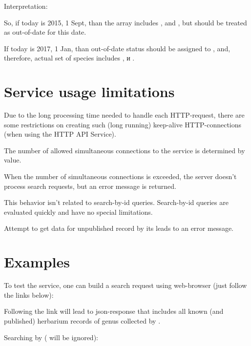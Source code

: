 \documentclass[letterpaper,10pt,english]{sphinxmanual}
\begin{document}
Interpretation:

So, if today is 2015, 1 Sept, than the array includes
,  and , but  should be treated
as out-of-date for this date.

If today is 2017,  1 Jan, than out-of-date status should be assigned to ,
and, therefore, actual set of species includes
,  и .


\section{Service usage limitations}
\label{\detokenize{http_api:service-usage-limitations}}
Due to the long processing time needed to handle each HTTP-request,
there are some restrictions on creating
such (long running) keep-alive HTTP-connections (when using the HTTP API Service).

The number of allowed simultaneous connections to the service is determined by
 value.

When the number of simultaneous connections is exceeded, the server doesn’t process
search requests, but an error message  is returned.

This behavior isn’t related to search-by-id queries.
Search-by-id queries are evaluated quickly and have no special limitations.

Attempt to get data for unpublished record by its  leads to an error message.


\section{Examples}
\label{\detokenize{http_api:examples}}
To test the service, one can build a search request
using web-browser (just follow the links below):


Following the link will lead to json-response that includes all known
(and published) herbarium records of genus  collected by .

Searching by  ( will be ignored):
\end{document}
